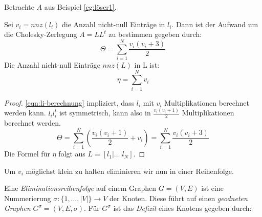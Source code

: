 \begin{example}
Betrachte $A$ aus Beispiel \ref{eg:löser1}.


\end{example}
\begin{lemma}
	Sei $v_i= nnz(l_i)$  die Anzahl nicht-null Einträge in $l_i$.
	Dann ist der Aufwand um die Cholesky-Zerlegung $A= LL^{t}$ zu bestimmen gegeben durch:
	\[
	\Theta = \sum_{i=1}^{N}\frac{v_i(v_i+3)}{2}
	\]
Die Anzahl nicht-null Einträge $nnz(L)$ in L ist:
\[
\eta = \sum_{i=1}^{N}v_i
\]
\end{lemma}
\begin{proof} \eqref{eqn:li-berechnung} impliziert, dass $l_i$ mit $v_i$  Multiplikationen berechnet werden kann. $l_il_i^{t}$ ist symmetrisch, kann also in $\frac{v_i(v_i+1)}{2}$ Multiplikationen berechnet werden.
	\[
	\Theta = \sum_{i=1}^{N}\left( \frac{v_i(v_i+1)}{2}+v_i \right)= \sum_{i=1}^{N}\frac{v_i(v_i+3)}{2}
	\]
Die Formel für $\eta$ folgt aus $L=[l_1|\ldots|l_N]$.
\end{proof}
Um $v_i$ möglichst klein zu halten eliminieren wir nun in einer Reihenfolge.
\begin{definition}
Eine \emph{Eliminationsreihenfolge} auf einem Graphen $G=(V,E)$ ist eine Nummerierung $\sigma \colon \{1,\ldots, |V|\}  \to V $ der Knoten. Diese führt auf einen \emph{geodneten Graphen} $G^{\sigma}= (V,E,\sigma)$. Für $G^{\sigma}$ ist das \emph{Defizit} eines Knotens gegeben durch: 
\end{definition}
